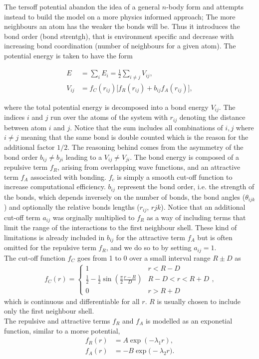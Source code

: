 The tersoff potential abandon the idea of a general $n$-body form and attempts instead to build the model on a more physics informed approach; The more neighbours an atom has the weaker the bonds will be. Thus it introduces the bond order (bond strentgh), that is environment specific and decrease with increasing bond coordination (number of neighbours for a given atom). The potential energy is taken to have the form

\begin{align*}
  E &= \sum_i E_i = \frac{1}{2}\sum_{i \ne j} V_{ij}, \\
  V_{ij} &= f_C(r_{ij}) \big[f_R(r_{ij}) + b_{ij}f_A(r_{ij})  \big],
\end{align*}

where the total potential energy is decomposed into a bond energy $V_{ij}$. The
indices $i$ and $j$ run over the atoms of the system with $r_{ij}$ denoting the
distance between atom $i$ and $j$. Notice that the sum includes all combinations
of $i,j$ where $i\ne j$ meaning that the same bond is double counted which is
the reason for the additional factor $1/2$. The reasoning behind comes from the asymmetry of the bond order $b_{ij}\ne b_{ji}$ leading to a $V_{ij}\ne V_{ji}$. The bond energy is
composed of a repulsive term $f_R$, arising from overlapping wave functions, and
an attractive term $f_A$ associated with bonding. $f_c$ is simply a smooth
cut-off function to increase computational efficiency. $b_{ij}$ represent the
bond order, i.e. the strength of the bonds, which depends inversely on the
number of bonds, the bond angles ($\theta_{ijk}$) and optionally the relative
bonds lengths ($r_{ij}$, $r{jk}$). Notice that an additional cut-off term
$a_{ij}$ was orginally multiplied to $f_R$ as a way of including terms that
limit the range of the interactions to the first neighbour shell. These kind of
limitations is already included in $b_{ij}$ for the attractive term $f_A$ but is
often omitted for the repulsive term $f_R$, and we do so to by setting $a_{ij} = 1$.
\\
The cut-off function $f_C$ goes from 1 to 0 over a small interval range $R \pm D$ as
\begin{align*}
  f_C(r) =
  \begin{cases}
    1 & r < R - D \\
    \frac{1}{2} - \frac{1}{2} \sin{(\frac{\pi}{2} \frac{r - R}{D})} & R - D < r < R + D\\
    0 & r > R + D
  \end{cases},
\end{align*}
which is continuous and differentiable for all $r$. $R$ is usually chosen to include only the first neighbour shell. \\
The repulsive and attractive terms $f_R$ and $f_A$ is modelled as an exponetial function, similar to a morse potential, 
\begin{align*}
 f_R(r) &= A \exp(-\lambda_1 r), \\
 f_A(r) &= -B \exp \big(-\lambda_2 r\big).
\end{align*}

